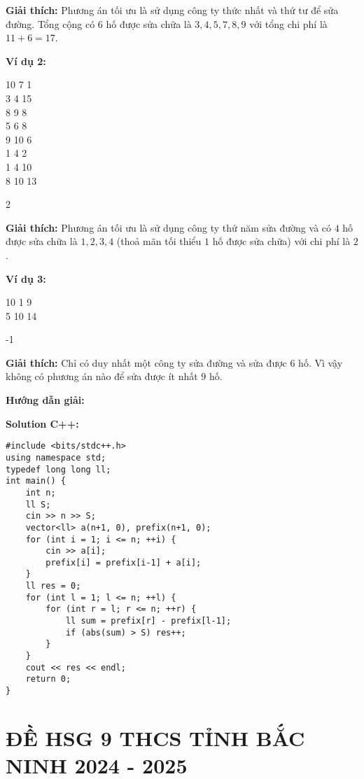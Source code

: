 \documentclass[12pt]{scrartcl}  %
\begin{document}
\textbf{Giải thích:}
Phương án tối ưu là sử dụng công ty thức nhất và thứ tư để sửa đường. Tổng cộng có $6$ hố được sửa chữa là $3, 4, 5, 7, 8, 9$ với tổng chi phí là $11 + 6 = 17$.

\textbf{Ví dụ 2:}
\begin{tcolorbox}[colback=gray!5!white, colframe=blue!50!black, title=Input]
10 7 1\\
3 4 15\\
8 9 8\\
5 6 8\\
9 10 6\\
1 4 2\\
1 4 10\\
8 10 13
\end{tcolorbox}
\begin{tcolorbox}[colback=gray!5!white, colframe=green!50!black, title=Output]
2
\end{tcolorbox}

\textbf{Giải thích:}
Phương án tối ưu là sử dụng công ty thứ năm sửa đường và có $4$ hố được sửa chữa là $1, 2, 3, 4$ (thoả mãn tối thiểu $1$ hố được sửa chữa) với chi phí là $2$.

\textbf{Ví dụ 3:}
\begin{tcolorbox}[colback=gray!5!white, colframe=blue!50!black, title=Input]
10 1 9\\
5 10 14
\end{tcolorbox}
\begin{tcolorbox}[colback=gray!5!white, colframe=green!50!black, title=Output]
-1
\end{tcolorbox}

\textbf{Giải thích:}
Chỉ có duy nhất một công ty sửa đường và sửa được $6$ hố. Vì vậy không có phương án nào để sửa được ít nhất $9$ hố.

\textbf{Hướng dẫn giải:}

\textbf{Solution C++:}
\begin{lstlisting}
#include <bits/stdc++.h>
using namespace std;
typedef long long ll;
int main() {
    int n;
    ll S;
    cin >> n >> S;
    vector<ll> a(n+1, 0), prefix(n+1, 0);
    for (int i = 1; i <= n; ++i) {
        cin >> a[i];
        prefix[i] = prefix[i-1] + a[i];
    }
    ll res = 0;
    for (int l = 1; l <= n; ++l) {
        for (int r = l; r <= n; ++r) {
            ll sum = prefix[r] - prefix[l-1];
            if (abs(sum) > S) res++;
        }
    }
    cout << res << endl;
    return 0;
}
\end{lstlisting}

\section{ĐỀ HSG 9 THCS TỈNH BẮC NINH 2024 - 2025}
\end{document}
